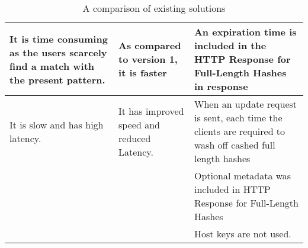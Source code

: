\begin{singlespace}
\begin{table}[!h]
\begin{center}
\begin{tabular}{ | m{13em} | m{12.9em} | m{13em} | }
				It is time consuming as the users scarcely
				find a match with the present pattern. & As compared to version 1, it is
				faster                                 & An expiration time is included in the HTTP
				Response for Full-Length Hashes in
				response                                                                                                                           \\
				\hline

				It is slow and has high latency.       & It has improved speed and reduced
				Latency.                               & When an update request is sent, each time the
				clients are required to wash off cashed full
				length hashes                                                                                                                      \\
				\hline
				                                       &                                                  & Optional metadata was included in HTTP
				Response for Full-Length Hashes                                                                                                    \\
				\hline
				                                       &                                                  & Host keys are not used.                \\
				\hline
			\end{tabular}
			\caption{A comparison of existing solutions \citep{Adebowale}}
			\label{tab:GSB_VERSIONS}
		\end{center}
	\end{table}
\end{singlespace}
